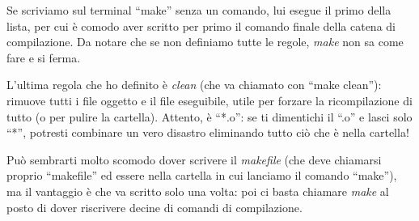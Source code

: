 Se scriviamo  sul terminal ``make'' senza un comando, lui esegue il primo della lista, per cui è comodo aver scritto per primo il comando finale della catena di compilazione. Da notare che se non definiamo tutte le regole, \emph{make} non sa come fare e si ferma.

L'ultima regola che ho definito è \emph{clean} (che va chiamato con ``make clean''): rimuove tutti i file oggetto e il file eseguibile, utile per forzare la ricompilazione di tutto (o per pulire la cartella). Attento, è ``*.o'': se ti dimentichi il ``.o'' e lasci solo ``*'', potresti combinare un vero disastro eliminando tutto ciò che è nella cartella! 

Può sembrarti molto scomodo dover scrivere il \emph{makefile} (che deve chiamarsi proprio ``makefile'' ed essere nella cartella in cui lanciamo il comando ``make''), ma il vantaggio è che va scritto solo una volta: poi ci basta chiamare \emph{make} al posto di dover riscrivere decine di comandi di compilazione.